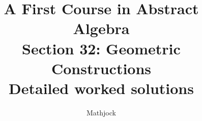 
\title{\textbf{A First Course in Abstract Algebra}\\[0.3em]Section 32: Geometric Constructions\\[0.3em]\large Detailed worked solutions}
\author{Mathjock}
\date{}

\maketitle
\bookinfo
\tableofcontents
\clearpage
\renewcommand{\thesection}{32}
\renewcommand{\theHsection}{fraleigh.32}


